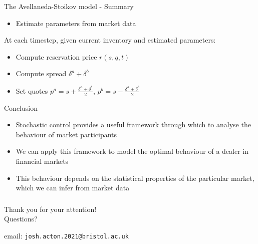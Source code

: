 \documentclass{beamer} %
\begin{document}
\begin{frame}{The Avellaneda-Stoikov model - Summary}
    \begin{itemize}
        \item Estimate parameters from market data
    \end{itemize}
    At each timestep, given current inventory and estimated parameters:
    \begin{itemize}
        \item Compute reservation price $r(s,q,t)$
        \item Compute spread $\delta^a+\delta^b$
        \item Set quotes $p^a=s+\frac{\delta^a+\delta^b}{2}$, $p^b=s-\frac{\delta^a+\delta^b}{2}$
    \end{itemize}
\end{frame}

\begin{frame}{Conclusion}
    \begin{itemize}
        \item Stochastic control provides a useful framework through which to analyse the behaviour of market participants
        \item We can apply this framework to model the optimal behaviour of a dealer in financial markets
        \item This behaviour depends on the statistical properties of the particular market, which we can infer from market data
    \end{itemize}
\end{frame}

\begin{frame}
    \frametitle{}
    \begin{center}
        \large{Thank you for your attention!}\\
        \vspace{1cm}
        Questions?
        \vspace{2cm}

        email: \texttt{josh.acton.2021@bristol.ac.uk}
    \end{center}
\end{frame}
\end{document}
